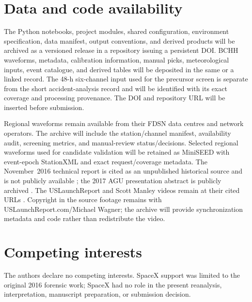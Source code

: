\documentclass[]{seismica}
\begin{document}
\section*{Data and code availability}

The Python notebooks, project modules, shared configuration, environment
specification, data manifest, output conventions, and derived products will be
archived as a versioned release in a repository issuing a persistent DOI. BCHH
waveforms, metadata, calibration information, manual picks, meteorological
inputs, event catalogue, and derived tables will be deposited in the same or a
linked record. The 48-h six-channel input used for the precursor screen is
separate from the short accident-analysis record and will be identified with
its exact coverage and processing provenance. The DOI and repository URL will be inserted before submission.

Regional waveforms remain available from their FDSN data centres and network
operators. The archive will include the station/channel manifest, availability
audit, screening metrics, and manual-review status/decisions. Selected regional
waveforms used for candidate validation will be retained as MiniSEED with
event-epoch StationXML and exact request/coverage metadata. The November~2016
technical report is cited as an unpublished historical source and is not
publicly available \citep{thompson_mcnutt_fireball_2016}; the 2017 AGU
presentation abstract is publicly archived \citep{thompson_agu_falcon9_2017}. The USLaunchReport and
Scott Manley videos remain at their cited URLs
\citep{uslaunchreport_amos6_video_2016,manley_spacex_explosion_2016}. Copyright
in the source footage remains with USLaunchReport.com/Michael Wagner; the
archive will provide synchronization metadata and code rather than redistribute
the video.

\section*{Competing interests}

The authors declare no competing interests. SpaceX support was limited to the
original 2016 forensic work; SpaceX had no role in the present reanalysis,
interpretation, manuscript preparation, or submission decision.


\end{document}
